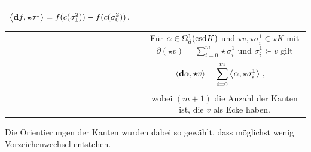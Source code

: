 \begin{bemerkung}
\begin{tabular}{|c|c|}
\begin{minipage}[c]{0.69\textwidth}
        {\begin{align}
          \left\langle \mathbf{d} f , \star\sigma^{1} \right\rangle &= f(c(\sigma^{2}_{1})) - f(c(\sigma^{2}_{0})) \,\text{.}
        \end{align}}
      \end{minipage} \\\hline
      \begin{minipage}[c]{0.30\textwidth}
        \centering
      \end{minipage} &
      \begin{minipage}[c]{0.68\textwidth}
        Für \( \alpha\in\Omega_{d}^{1}(\text{csd} K) \) und \( \star v, \star\sigma_{i}^{1} \in \star K \) mit
        \( \partial(\star v) = \sum_{i=0}^{m} \star\sigma_{i}^{1} \) und \( \sigma_{i}^{1} \succ v  \) gilt
        {\begin{align}
          \left\langle \mathbf{d} \alpha , \star v \right\rangle &=  \sum_{i=0}^{m} \left\langle \alpha, \star\sigma_{i}^{1}\right\rangle
          \,\text{,}
        \end{align}}
        wobei \( (m+1) \) die Anzahl der Kanten ist, die \( v \) als Ecke haben.
      \end{minipage} \\\hline
    \end{tabular}
    Die Orientierungen der Kanten wurden dabei so gewählt, dass möglichst wenig Vorzeichenwechsel entstehen.
  \end{bemerkung}

